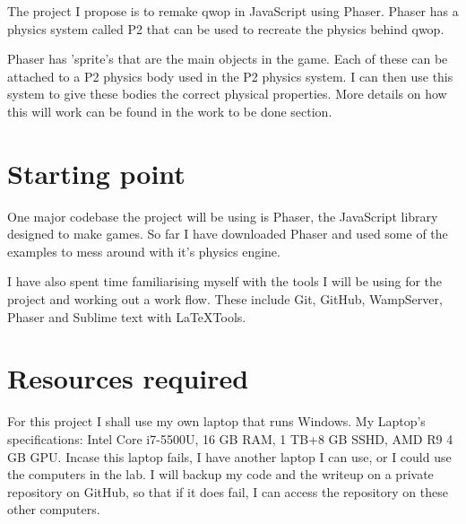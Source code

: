 \documentclass[12pt,a4paper,twoside]{article}
\begin{document}
The project I propose is to remake qwop in JavaScript using Phaser. Phaser has a physics system called P2 that can be used to recreate the physics behind qwop.

Phaser has 'sprite's that are the main objects in the game. Each of these can be attached to a P2 physics body used in the P2 physics system. I can then use this system to give these bodies the correct physical properties.
More details on how this will work can be found in the work to be done section.


 

\section*{Starting point}


One major codebase the project will be using is Phaser, the JavaScript library designed to make games.
So far I have downloaded Phaser and used some of the examples to mess around with it's physics engine.

I have also spent time familiarising myself with the tools I will be using for the project and working out a work flow. These include Git, GitHub, WampServer, Phaser and Sublime text with LaTeXTools.

\section*{Resources required}


For this project I shall use my own laptop that runs Windows.
My Laptop's specifications:
Intel Core i7-5500U, 16 GB RAM, 1 TB+8 GB SSHD, AMD R9 4 GB GPU.
Incase this laptop fails, I have another laptop I can use, or I could use the computers in the lab. I will backup my code and the writeup on a private repository on GitHub, so that if it does fail, I can access the repository on these other computers.
\end{document}
